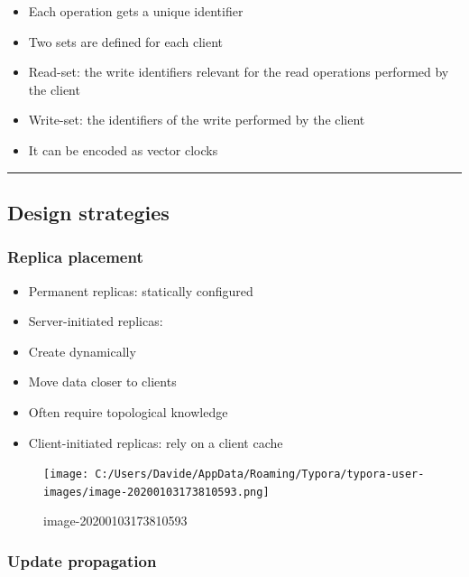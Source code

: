 \begin{itemize}
\itemsep1pt\parskip0pt
\item
  Each operation gets a unique identifier
\item
  Two sets are defined for each client
\item
  Read-set: the write identifiers relevant for the read operations
  performed by the client
\item
  Write-set: the identifiers of the write performed by the client
\item
  It can be encoded as vector clocks
\end{itemize}

\begin{center}\rule{3in}{0.4pt}\end{center}

\subsection{Design strategies}\label{design-strategies}

\subsubsection{Replica placement}\label{replica-placement}

\begin{itemize}
\itemsep1pt\parskip0pt
\item
  Permanent replicas: statically configured
\item
  Server-initiated replicas:
\item
  Create dynamically
\item
  Move data closer to clients
\item
  Often require topological knowledge
\item
  Client-initiated replicas: rely on a client cache
\end{itemize}

\begin{figure}[htbp]
\centering
\texttt{[image: C:/Users/Davide/AppData/Roaming/Typora/typora-user-images/image-20200103173810593.png]}
\caption{image-20200103173810593}
\end{figure}

\subsubsection{Update propagation}\label{update-propagation}

